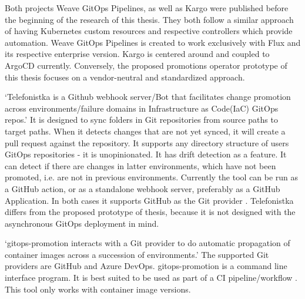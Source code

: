 Both projects Weave GitOps Pipelines, as well as Kargo
were published before the beginning of the research of this thesis.
They both follow a similar approach of having Kubernetes custom resources and respective
controllers which provide automation.
Weave GitOps Pipelines is created to work exclusively with Flux and its respective enterprise version.
Kargo is centered around and coupled to ArgoCD currently.
Conversely, the proposed promotions operator prototype of this thesis
focuses on a vendor-neutral and standardized approach.


\enquote*{Telefonistka is a Github webhook server/Bot that facilitates change promotion across environments/failure domains in Infrastructure as Code(IaC) GitOps repos.}
\autocite{telefonistka}
It is designed to sync folders in Git repositories from source paths to target paths.
When it detects changes that are not yet synced,
it will create a pull request against the repository.
It supports any directory structure of users GitOps repositories -
it is unopinionated.
It has drift detection as a feature. It can detect if there are changes in
latter environments, which have not been promoted, i.e. are not in previous environments.
Currently the tool can be run as a GitHub action, or as a
standalone webhook server, preferably as a GitHub Application.
In both cases it supports GitHub as the Git provider
\autocite{telefonistka}.
Telefonistka differs from the proposed prototype of thesis,
because it is not designed with the asynchronous GitOps deployment in mind.


\enquote*{gitops-promotion interacts with a Git provider to do automatic propagation of container images across a succession of environments.}
\autocite{xenitABgitopsPromotion}
The supported Git providers are GitHub and Azure DevOps.
gitops-promotion is a command line interface program.
It is best suited to be used as part of a CI pipeline/workflow
\autocite{xenitABgitopsPromotion}.
This tool only works with container image versions.


